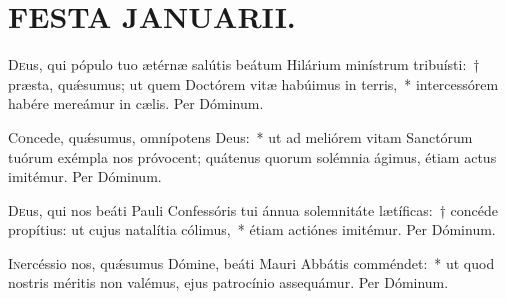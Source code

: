 \documentclass[vesperale_romanum.tex]{subfiles}
\begin{document}
\section[Festa Januarii]{FESTA JANUARII.}


\duplexmtv


\oratio

\lettrine{D}{e}us, qui pópulo tuo ætérnæ salútis beátum Hilárium minístrum tribuísti:~† præsta, quǽsumus; ut quem Do\-ctórem vitæ habúimus in terris,~* intercessórem habére mereámur in cælis.
Per Dóminum.


\oratio

\lettrine{C}{o}ncede, quǽsumus, omnípotens Deus:~* ut ad meliórem vitam Sanctórum tuórum exémpla nos próvocent; quátenus quorum solémnia ágimus, étiam actus imitémur.
Per Dóminum.

\myrule


\duplexmtv

\oratio

\lettrine{D}{e}us, qui nos beáti Pauli Confessóris tui ánnua sole\-mnitáte lætíficas:~† concéde propítius: ut cujus natalítia cólimus,~* étiam actiónes imitémur. Per Dóminum.




\oratio

\lettrine{I}{n}ercéssio nos, quǽsumus Dómine, beáti Mauri Abbátis comméndet:~* ut quod nostris méritis non valémus, ejus patrocínio assequámur.
Per Dóminum.
\end{document}
